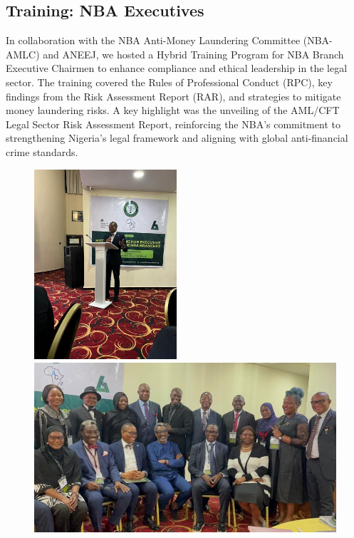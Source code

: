 \documentclass[
  letterpaper,
  DIV=11,
  numbers=noendperiod]{scrreprt}
\begin{document}
\subsection{Training: NBA Executives}\label{training-nba-executives}

In collaboration with the NBA Anti-Money Laundering Committee (NBA-AMLC)
and ANEEJ, we hosted a Hybrid Training Program for NBA Branch Executive
Chairmen to enhance compliance and ethical leadership in the legal
sector. The training covered the Rules of Professional Conduct (RPC),
key findings from the Risk Assessment Report (RAR), and strategies to
mitigate money laundering risks. A key highlight was the unveiling of
the AML/CFT Legal Sector Risk Assessment Report, reinforcing the NBA's
commitment to strengthening Nigeria's legal framework and aligning with
global anti-financial crime standards.

\begin{figure}

\begin{minipage}{0.31\linewidth}
\includegraphics[width=2.08333in,height=\textheight,keepaspectratio]{images/strengthen/16_0_hnba.png}\end{minipage}%
%
\begin{minipage}{0.69\linewidth}
\includegraphics[width=4.6875in,height=\textheight,keepaspectratio]{images/strengthen/16_1_hnba.png}\end{minipage}%

\end{figure}%
\end{document}
